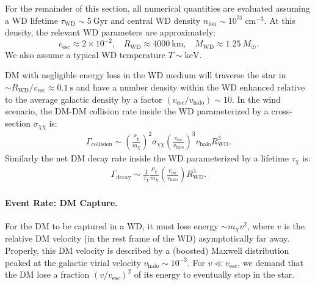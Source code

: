 \documentclass[preprintnumbers,amsmath,amssymb,prd,superscriptaddress]{revtex4}
\newcommand{\cm}{\text{cm}}
\def\r{\right)}
\def\l{\left(}
\begin{document}
For the remainder of this section, all numerical quantities are evaluated assuming a WD lifetime $\tau_\text{WD} \sim 5 ~\text{Gyr}$ and central WD density $n_\text{ion} \sim 10^{31} ~\cm^{-3}$. 
At this density, the relevant WD parameters are approximately: 
\begin{equation}
v_\text{esc} \approx 2 \times 10^{-2}, ~~~~ R_\text{WD} \approx 4000 ~\text{km}, ~~~~ M_\text{WD} \approx 1.25 ~M_{\astrosun}.
\end{equation}
We also assume a typical WD temperature $T \sim \text{keV}$.

DM with negligible energy loss in the WD medium will traverse the star in $\sim R_\text{WD}/v_\text{esc} \approx 0.1 ~\text{s}$ and have a number density within the WD enhanced relative to the average galactic density by a factor $(v_\text{esc}/v_\text{halo}) \sim 10$.
In the wind scenario, the DM-DM collision rate inside the WD parameterized by a cross-section $\sigma_{\chi \chi}$ is:
\begin{align}
  \Gamma_\text{collision}
  \sim \l \frac{\rho_\chi}{m_\chi} \r^2 \sigma_{\chi \chi} \l \frac{v_\text{esc}}{v_\text{halo}}\r^3 v_\text{halo} R_\text{WD}^3.
  \label{eq:collisionDM}
\end{align}
Similarly the net DM decay rate inside the WD parameterized by a lifetime $\tau_\chi$ is:
\begin{align}
 \Gamma_\text{decay}
   \sim \frac{1}{\tau_\chi} \frac{\rho_{\chi}}{m_\chi} \l \frac{v_\text{esc}}{v_\text{halo}}\r R_\text{WD}^3.
  \label{eq:decayDM}
\end{align}

\paragraph{Event Rate: DM Capture.}
For the DM to be captured in a WD, it must lose energy $\sim m_\chi v^2$, where $v$ is the relative DM velocity (in the rest frame of the WD) asymptotically far away.
Properly, this DM velocity is described by a (boosted) Maxwell distribution peaked at the galactic virial velocity $v_\text{halo} \sim 10^{-3}$. 
For $v \ll v_\text{esc}$, we demand that the DM lose a fraction $(v/v_\text{esc})^2$ of its energy to eventually stop in the star. 
\end{document}
